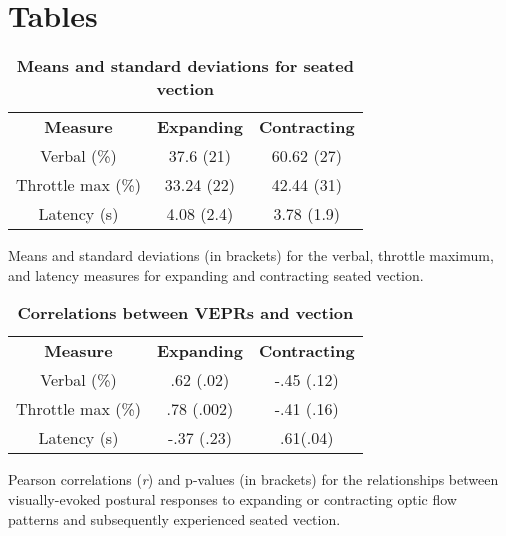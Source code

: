 \documentclass[11pt]{article}
\begin{document}

\newpage
\section*{Tables}

\begin{table}[!ht]
\caption{
\bf{Means and standard deviations for seated vection}}
\begin{tabular}{|c|c|c|}
{\bf Measure} & {\bf Expanding} & {\bf Contracting}  \\ 
Verbal (\%) & 37.6 (21) & 60.62 (27)   \\
Throttle max (\%) &  33.24 (22)  & 42.44 (31)  \\
Latency (s) & 4.08 (2.4) & 3.78 (1.9)  \\
\end{tabular}
\begin{flushleft} Means and standard deviations (in brackets) for the verbal, throttle maximum, and latency measures for expanding and contracting seated vection.  
\end{flushleft}
\label{Table_0}
 \end{table}

\begin{table}[!ht]
\caption{
\bf{Correlations between VEPRs and vection}}
\begin{tabular}{|c|c|c|}
{\bf Measure} & {\bf Expanding} & {\bf Contracting}  \\ 
Verbal (\%) & .62 (.02) & -.45 (.12)   \\
Throttle max (\%) &  .78 (.002)  & -.41 (.16)  \\
Latency (s) & -.37 (.23) & .61(.04)  \\
\end{tabular}
\begin{flushleft} Pearson correlations (\emph{r}) and p-values (in brackets) for the relationships between visually-evoked postural responses to expanding or contracting optic flow patterns and subsequently experienced seated vection. 
\end{flushleft}
\label{Table_1}
 \end{table}
 
\end{document}

